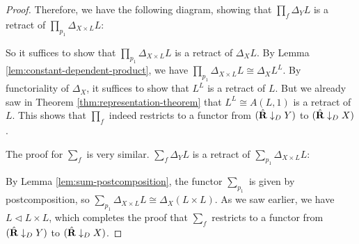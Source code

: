\begin{proof}
  Therefore, we have the following diagram, showing that $ \prod_f \Delta_Y L $ is a retract of $ \prod_{p_1} \Delta_{X \times L} L $:
  \begin{center}
  \end{center}
  So it suffices to show that $ \prod_{p_1} \Delta_{X \times L} L $ is a retract of $ \Delta_X L $. By Lemma \ref{lem:constant-dependent-product}, we have $ \prod_{p_1} \Delta_{X \times L} L \cong \Delta_X L^L $. By functoriality of $ \Delta_X $, it suffices to show that $ L^L $ is a retract of $ L $. But we already saw in Theorem \ref{thm:representation-theorem} that $ L^L \cong A(L, 1) $ is a retract of $ L $. This shows that $ \prod_f $ indeed restricts to a functor from $ (\hat {\mathbf{R}} \downarrow_D Y) $ to $ (\hat {\mathbf{R}} \downarrow_D X) $.

  The proof for $ \sum_f $ is very similar. $ \sum_f \Delta_Y L $ is a retract of $ \sum_{p_1} \Delta_{X \times L} L $:
  \begin{center}
  \end{center}
  By Lemma \ref{lem:sum-postcomposition}, the functor $ \sum_{p_1} $ is given by postcomposition, so $ \sum_{p_1} \Delta_{X \times L} L \cong \Delta_X (L \times L) $. As we saw earlier, we have $ L \triangleleft L \times L $, which completes the proof that $ \sum_f $ restricts to a functor from $ (\hat {\mathbf{R}} \downarrow_D Y) $ to $ (\hat {\mathbf{R}} \downarrow_D X) $.
\end{proof}

